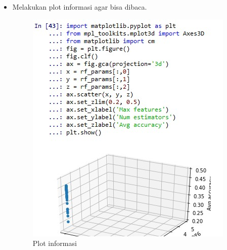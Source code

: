 \begin{enumerate}
\begin{itemize}
\begin{figure}[ht]
			\label{contoh}
			\end{figure}
		\item Melakukan plot informasi agar bisa dibaca.
			\begin{figure}[ht]
			\centering
			\includegraphics[scale=0.5]{figures/k82.jpg}
			\caption{Plot informasi}
			\label{contoh}
			\end{figure}
	\end{itemize}
\end{enumerate}

